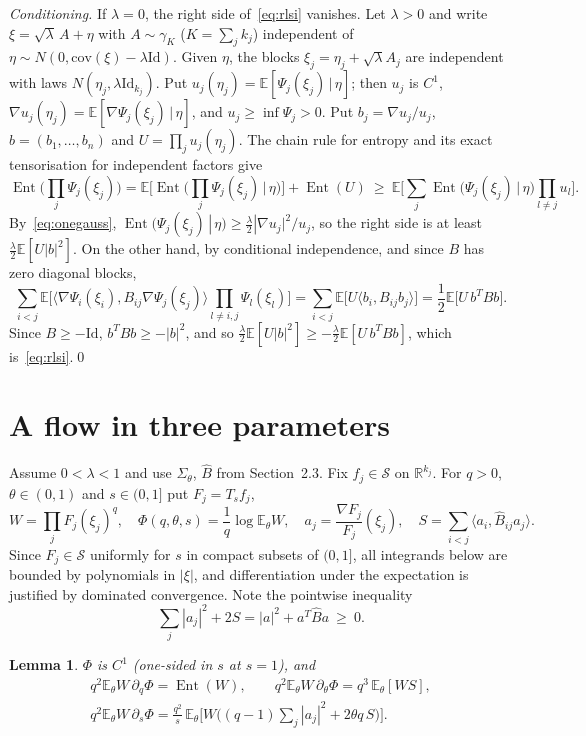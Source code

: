 \documentclass[11pt]{amsart}
\newtheorem{lemma}[theorem]{Lemma}
\theoremstyle{definition}
\newcommand{\E}{\mathbb{E}}
\newcommand{\R}{\mathbb{R}}
\newcommand{\Ent}{\operatorname{Ent}}
\newcommand{\cS}{\mathcal{S}}
\newcommand{\Id}{\mathrm{Id}}
\begin{document}
\emph{Conditioning.} If $\lambda=0$, the right side of~\eqref{eq:rlsi} vanishes. Let $\lambda>0$ and write
$\xi=\sqrt\lambda\,A+\eta$ with $A\sim\gamma_{K}$ ($K=\sum_jk_j$) independent of $\eta\sim N(0,\mathrm{cov}(\xi)-\lambda\Id)$.
Given $\eta$, the blocks $\xi_j=\eta_j+\sqrt\lambda A_j$ are independent with laws $N(\eta_j,\lambda\Id_{k_j})$. Put
$u_j(\eta_j)=\E[\Psi_j(\xi_j)\,|\,\eta]$; then $u_j$ is $C^1$, $\nabla u_j(\eta_j)=\E[\nabla\Psi_j(\xi_j)\,|\,\eta]$, and
$u_j\ge\inf\Psi_j>0$. Put $b_j=\nabla u_j/u_j$, $b=(b_1,\dots,b_n)$ and $U=\prod_ju_j(\eta_j)$. The chain rule for
entropy and its exact tensorisation for independent factors give
\[
\Ent\Big(\prod_j\Psi_j(\xi_j)\Big)=\E\Big[\Ent\Big(\prod_j\Psi_j(\xi_j)\,\Big|\,\eta\Big)\Big]+\Ent(U)
\ \ge\ \E\Big[\sum_j\Ent\big(\Psi_j(\xi_j)\,\big|\,\eta\big)\prod_{l\ne j}u_l\Big].
\]
By~\eqref{eq:onegauss}, $\Ent(\Psi_j(\xi_j)\,|\,\eta)\ge\frac\lambda2|\nabla u_j|^2/u_j$, so the right side is at least
$\frac\lambda2\E[U|b|^2]$. On the other hand, by conditional independence, and since $B$ has zero diagonal blocks,
\[
\sum_{i<j}\E\Big[\langle\nabla\Psi_i(\xi_i),B_{ij}\nabla\Psi_j(\xi_j)\rangle\prod_{l\ne i,j}\Psi_l(\xi_l)\Big]
=\sum_{i<j}\E\big[U\langle b_i,B_{ij}b_j\rangle\big]=\frac12\E\big[U\,b^TBb\big].
\]
Since $B\ge-\Id$, $b^TBb\ge-|b|^2$, and so $\frac\lambda2\E[U|b|^2]\ge-\frac\lambda2\E[U\,b^TBb]$, which
is~\eqref{eq:rlsi}.\qed

\section{A flow in three parameters}
Assume $0<\lambda<1$ and use $\Sigma_\theta$, $\widehat B$ from Section~2.3. Fix $f_j\in\cS$ on $\R^{k_j}$. For $q>0$,
$\theta\in(0,1)$ and $s\in(0,1]$ put $F_j=T_sf_j$,
\[
W=\prod_jF_j(\xi_j)^q,\quad\Phi(q,\theta,s)=\frac1q\log\E_\theta W,\quad a_j=\frac{\nabla F_j}{F_j}(\xi_j),\quad
S=\sum_{i<j}\langle a_i,\widehat B_{ij}a_j\rangle .
\]
Since $F_j\in\cS$ uniformly for $s$ in compact subsets of $(0,1]$, all integrands below are bounded by polynomials in
$|\xi|$, and differentiation under the expectation is justified by dominated convergence. Note the pointwise
inequality
\begin{equation}\label{eq:pointwise}
\sum_j|a_j|^2+2S=|a|^2+a^T\widehat Ba\ \ge\ 0 .
\end{equation}

\begin{lemma}\label{lem:deriv}
$\Phi$ is $C^1$ (one-sided in $s$ at $s=1$), and
\begin{gather*}
q^2\E_\theta W\,\partial_q\Phi=\Ent(W),\qquad q^2\E_\theta W\,\partial_\theta\Phi=q^3\,\E_\theta[WS],\\
q^2\E_\theta W\,\partial_s\Phi=\frac{q^2}s\,\E_\theta\Big[W\Big((q-1)\sum_j|a_j|^2+2\theta q\,S\Big)\Big].
\end{gather*}
\end{lemma}
\end{document}
